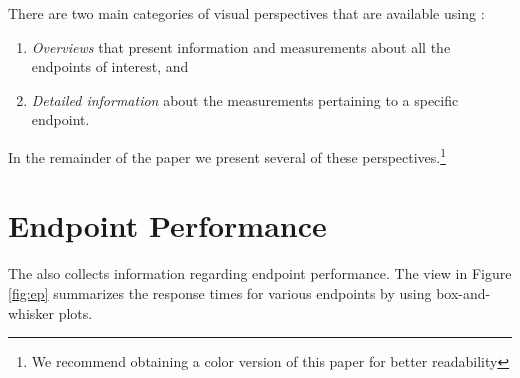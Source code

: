 \documentclass[conference]{IEEEtran}
\begin{document}
  There are two main categories of visual perspectives that are available using \tool:
  \begin{enumerate}
    \item \textit{Overviews} that present information and measurements about all the endpoints of interest, and
    \item \textit{Detailed information} about the measurements pertaining to a specific endpoint.
  \end{enumerate}

  In the remainder of the paper we present several of these perspectives.\footnote{We recommend obtaining a color version of this paper for better readability}






\section{Endpoint Performance}
\label{sec:perf}

  The \tool also collects information regarding endpoint performance. The view in Figure \ref{fig:ep} summarizes the response times for various endpoints by using box-and-whisker plots. 

\end{document}
